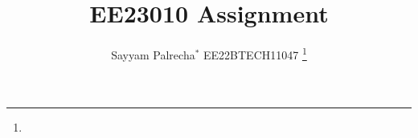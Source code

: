 \documentclass[journal,12pt,twocolumn]{IEEEtran}
\theoremstyle{remark}
\begin{document}



\vspace{3cm}

\title{
EE23010 Assignment
}
\author{ Sayyam Palrecha$^{*}$ EE22BTECH11047%
	\thanks{}
	
}


%
%
%

% 
%



% 
\end{document}
